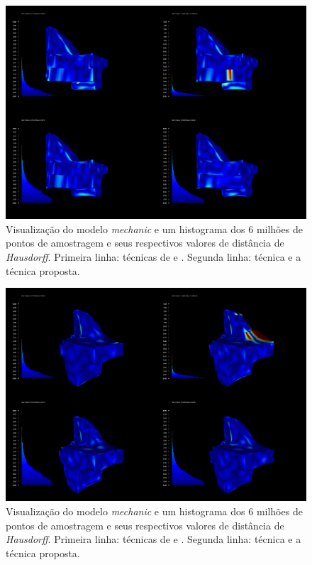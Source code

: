 \clearpage


\begin{figure}[p]
\captionsetup{width=\linewidth}
\centering
\includegraphics[width=16cm]{figuras/mechanic1_hausdorff_final.png}
\caption{Visualização do modelo \textit{mechanic} e um histograma dos 6 milhões de pontos de amostragem e seus respectivos valores de distância de \textit{Hausdorff}. Primeira linha: técnicas de \cite{zhang2015guided} e \cite{sun2007fast}. Segunda linha: técnica \cite{zheng2011bilateral} e a técnica proposta.}
\label{fig:mechanic1_hausdorff_final}
\end{figure}

\clearpage


\begin{figure}[p]
\captionsetup{width=\linewidth}
\centering
\includegraphics[width=16cm]{figuras/mechanic2_hausdorff_final.png}
\caption{Visualização do modelo \textit{mechanic} e um histograma dos 6 milhões de pontos de amostragem e seus respectivos valores de distância de \textit{Hausdorff}. Primeira linha: técnicas de \cite{zhang2015guided} e \cite{sun2007fast}. Segunda linha: técnica \cite{zheng2011bilateral} e a técnica proposta.}
\label{fig:mechanic2_hausdorff_final}
\end{figure}

